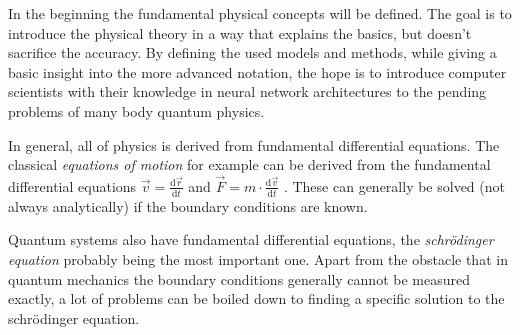 In the beginning the fundamental physical concepts will be defined. 
The goal is to introduce the physical theory in a way that explains the basics, but doesn't sacrifice the accuracy. 
By defining the used models and methods, while giving a basic insight into the more advanced notation, the hope is to introduce computer scientists with their knowledge in neural network architectures to the pending problems of many body quantum physics.

In general, all of physics is derived from fundamental differential equations. 
The classical \emph{equations of motion} for example can be derived from the fundamental differential equations $\vec{v} = \frac{\mathrm{d}\vec{r}}{\mathrm{d}t}$ and $\vec{F} = m \cdot \frac{\mathrm{d}\vec{v}}{\mathrm{d}t}$ \cite{demtroderExperimentalphysik}.
These can generally be solved (not always analytically) if the boundary conditions are known.

Quantum systems also have fundamental differential equations, the \emph{schrödinger equation} probably being the most important one. Apart from the obstacle that in quantum mechanics the boundary conditions generally cannot be measured exactly, a lot of problems can be boiled down to finding a specific solution to the schrödinger equation.